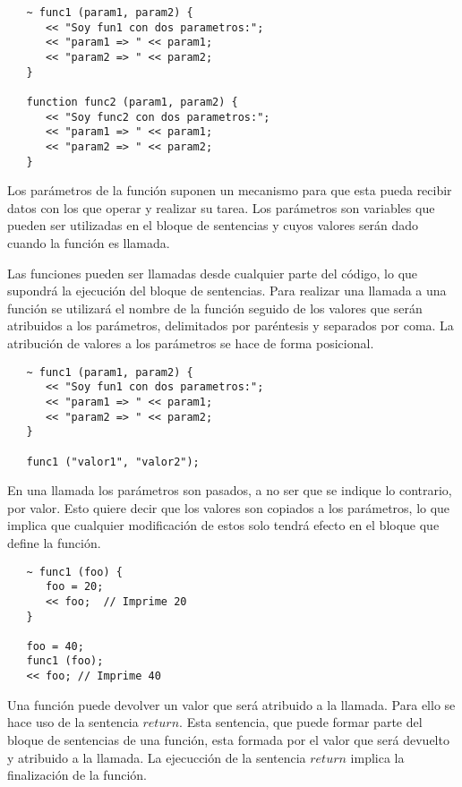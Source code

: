 \begin{lstlisting}
   ~ func1 (param1, param2) { 
      << "Soy fun1 con dos parametros:";
      << "param1 => " << param1;
      << "param2 => " << param2;
   }
   
   function func2 (param1, param2) { 
      << "Soy func2 con dos parametros:";
      << "param1 => " << param1;
      << "param2 => " << param2;
   }
\end{lstlisting}

Los parámetros de la función suponen un mecanismo para que esta pueda recibir datos con los que operar
y realizar su tarea. Los parámetros son variables que pueden ser utilizadas en el bloque de sentencias
y cuyos valores serán dado cuando la función es llamada.

Las funciones pueden ser llamadas desde cualquier parte del código, lo que supondrá la ejecución del bloque
de sentencias. Para realizar una llamada a una función se utilizará el nombre de la función seguido de los 
valores que serán atribuidos a los parámetros, delimitados por paréntesis y separados por coma. La atribución
de valores a los parámetros se hace de forma posicional. \\

\begin{lstlisting}
   ~ func1 (param1, param2) { 
      << "Soy fun1 con dos parametros:";
      << "param1 => " << param1;
      << "param2 => " << param2;
   }
   
   func1 ("valor1", "valor2");
\end{lstlisting}

En una llamada los parámetros son pasados, a no ser que se indique lo contrario, por valor. Esto quiere decir 
que los valores son copiados a los parámetros, lo que implica que cualquier modificación de estos solo tendrá efecto en el bloque 
que define la función. \\


\begin{lstlisting}
   ~ func1 (foo) { 
      foo = 20;
      << foo;  // Imprime 20
   }
   
   foo = 40;
   func1 (foo);
   << foo; // Imprime 40
\end{lstlisting}


Una función puede devolver un valor que será atribuido a la llamada. Para ello 
se hace uso de la sentencia $return$. Esta sentencia, que puede formar parte del
bloque de sentencias de una función, esta formada por el valor que será devuelto 
y atribuido a la llamada. La ejecucción de la sentencia $return$ implica 
la finalización de la función.

